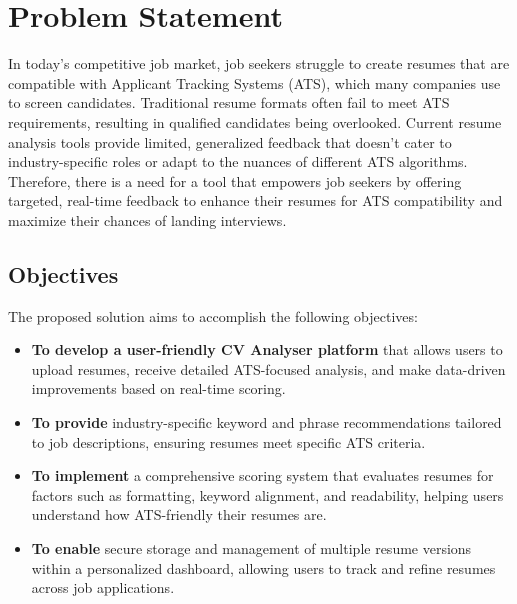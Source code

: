 \documentclass[12pt,a4paper]{report}
\begin{document}
\chapter{Problem Statement} In today’s competitive job market, job seekers struggle to create resumes that are compatible with Applicant Tracking Systems (ATS), which many companies use to screen candidates. Traditional resume formats often fail to meet ATS requirements, resulting in qualified candidates being overlooked. Current resume analysis tools provide limited, generalized feedback that doesn’t cater to industry-specific roles or adapt to the nuances of different ATS algorithms. Therefore, there is a need for a tool that empowers job seekers by offering targeted, real-time feedback to enhance their resumes for ATS compatibility and maximize their chances of landing interviews.

\section{Objectives} The proposed solution aims to accomplish the following objectives:

\begin{itemize} \item \textbf{To develop a user-friendly CV Analyser platform} that allows users to upload resumes, receive detailed ATS-focused analysis, and make data-driven improvements based on real-time scoring. \item \textbf{To provide} industry-specific keyword and phrase recommendations tailored to job descriptions, ensuring resumes meet specific ATS criteria.\item \textbf{To implement} a comprehensive scoring system that evaluates resumes for factors such as formatting, keyword alignment, and readability, helping users understand how ATS-friendly their resumes are. \item \textbf{To enable} secure storage and management of multiple resume versions within a personalized dashboard, allowing users to track and refine resumes across job applications. \end{itemize}
\newpage
\end{document}
